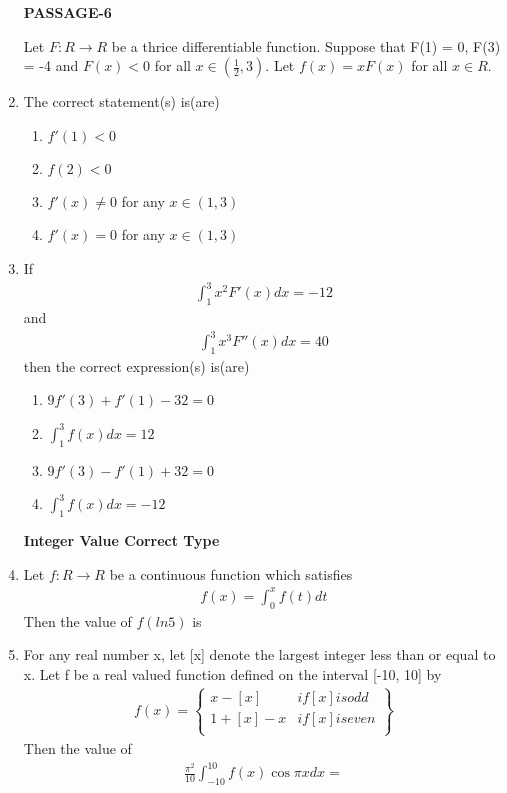 \begin{enumerate}[label=\arabic*.,ref=\thesubsection.\theenumi]
\textbf{PASSAGE-6}

Let $F: R \to R$ be a thrice differentiable function. Suppose that F(1) = 0, F(3) = -4 and $F(x) < 0$ for all $x \in \left(\frac{1}{2}, 3\right)$. Let $f(x) = xF(x)$ for all $x \in R$.

\item The correct statement(s) is(are)
\begin{enumerate}
\item $f'(1) < 0$
\item $f(2) < 0$
\item $f'(x) \neq 0$ for any $x \in (1, 3)$
\item $f'(x) = 0$ for any $x \in (1, 3)$
\end{enumerate}

\item If 
\begin{align*}
\int_{1}^{3}x^2F'(x)dx = -12
\end{align*}
and
\begin{align*}
\int_{1}^{3}x^3F''(x)dx = 40
\end{align*}
then the correct expression(s) is(are)
\begin{enumerate}
\item $9f'(3) + f'(1) - 32 = 0$
\item $\int_{1}^{3}f(x)dx = 12$
\item $9f'(3) - f'(1) + 32 = 0$
\item $\int_{1}^{3}f(x)dx = -12$
\end{enumerate}

\textbf{Integer Value Correct Type}

\item Let $f: R \to R$ be a continuous function which satisfies
\begin{align*}
f(x) = \int_{0}^{x}f(t)dt
\end{align*}
Then the value of $f(ln 5)$ is

\item For any real number x, let [x] denote the largest integer less than or equal to x. Let f be a real valued function defined on the interval [-10, 10] by
\begin{align*}
f(x) = 
\left\lbrace
\begin{array}{ll}
      x - [x] & if [x] is odd\\
      1 + [x] - x & if [x] is even\\
\end{array}
\right\rbrace
\end{align*}
Then the value of 
\begin{align*}
\frac{\pi^{2}}{10}\int_{-10}^{10}f(x)\cos \pi x dx = 
\end{align*}


\end{enumerate}
